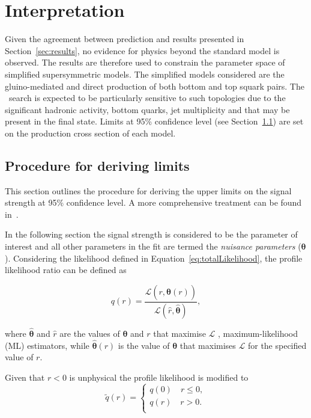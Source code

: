 \clearpage
\section{Interpretation}

Given the agreement between prediction and results presented in Section~\ref{sec:results}, no evidence
for physics beyond the standard model is observed. The results are therefore used to constrain
the parameter space of simplified supersymmetric models. The simplified 
models considered are the gluino-mediated and direct production of
both bottom and top squark pairs. The \alphat~search is expected to be particularly
sensitive to such topologies due to the significant hadronic activity, bottom quarks, jet multiplicity
and \mht that may be present in the final state. Limits at 95\% confidence level (see Section~\ref{sec:limits}) 
are set on the production cross section of each model.

\subsection{Procedure for deriving limits}
\label{sec:limits}

This section outlines the procedure for deriving the upper limits on the signal 
strength at 95\% confidence level. A more comprehensive treatment can be found in~\cite{asymp}.

In the following section the signal strength is considered to be the parameter of interest
and all other parameters in the fit are termed the \emph{nuisance parameters} ($\boldsymbol{\theta}$). Considering
the likelihood defined in Equation~\ref{eq:totalLikelihood}, the profile likelihood ratio can be defined as

\begin{equation}
\label{eq:profile}
q(r) = \frac{\mathcal{L}(r,\hat{\boldsymbol{\theta}}(r))}{\mathcal{L}(\hat{r},\hat{\boldsymbol{\theta}})},
\end{equation}

where $\hat{\boldsymbol{\theta}}$ and $\hat{r}$ are the values of $\boldsymbol{\theta}$ and $r$ that maximise $\mathcal{L}$
, maximum-likelihood (ML) estimators, while $\hat{\boldsymbol{\theta}}(r)$ is the value
of $\boldsymbol{\theta}$ that maximises $\mathcal{L}$ for the specified value of $r$. 

Given that $r < 0$ is unphysical the profile likelihood is modified to
\begin{equation}
\label{eq:profileNew}
\tilde{q}(r) = 
\begin{cases}
q(0)\quad r \le 0, \\ 
q(r)\quad r > 0. \\ 
\end{cases}
\end{equation}

